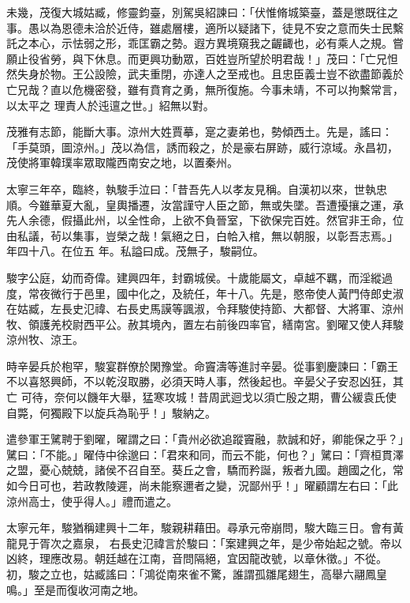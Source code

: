 \begin{pinyinscope}
 未幾，茂復大城姑臧，修靈鈞臺，別駕吳紹諫曰：「伏惟脩城築臺，蓋是懲既往之事。愚以為恩德未洽於近侍，雖處層樓，適所以疑諸下，徒見不安之意而失士民繫託之本心，示怯弱之形，乖匡霸之勢。遐方異境窺我之齷齱也，必有乘人之規。嘗願止役省勞，與下休息。而更興功動眾，百姓豈所望於明君哉！」茂曰：「亡兄怛然失身於物。王公設險，武夫重閉，亦達人之至戒也。且忠臣義士豈不欲盡節義於亡兄哉？直以危機密發，雖有賁育之勇，無所復施。今事未靖，不可以拘繫常言，以太平之
 理責人於迍邅之世。」紹無以對。



 茂雅有志節，能斷大事。涼州大姓賈摹，寔之妻弟也，勢傾西土。先是，謠曰：「手莫頭，圖涼州。」茂以為信，誘而殺之，於是豪右屏跡，威行涼域。永昌初，茂使將軍韓璞率眾取隴西南安之地，以置秦州。



 太寧三年卒，臨終，執駿手泣曰：「昔吾先人以孝友見稱。自漢初以來，世執忠順。今雖華夏大亂，皇輿播遷，汝當謹守人臣之節，無或失墜。吾遭擾攘之運，承先人余德，假攝此州，以全性命，上欲不負晉室，下欲保完百姓。然官非王命，位由私議，茍以集事，豈榮之哉！氣絕之日，白帢入棺，無以朝服，以彰吾志焉。」年四十八。在位五
 年。私謚曰成。茂無子，駿嗣位。



 駿字公庭，幼而奇偉。建興四年，封霸城侯。十歲能屬文，卓越不羈，而淫縱過度，常夜微行于邑里，國中化之，及統任，年十八。先是，愍帝使人黃門侍郎史淑在姑臧，左長史氾禕、右長史馬謨等諷淑，令拜駿使持節、大都督、大將軍、涼州牧、領護羌校尉西平公。赦其境內，置左右前後四率官，繕南宮。劉曜又使人拜駿涼州牧、涼王。



 時辛晏兵於枹罕，駿宴群僚於閑豫堂。命竇濤等進討辛晏。從事劉慶諫曰：「霸王不以喜怒興師，不以乾沒取勝，必須天時人事，然後起也。辛晏父子安忍凶狂，其亡
 可待，奈何以饑年大舉，猛寒攻城！昔周武迴戈以須亡殷之期，曹公緩袁氏使自斃，何獨殿下以旋兵為恥乎！」駿納之。



 遣參軍王騭聘于劉曜，曜謂之曰：「貴州必欲追蹤竇融，款誠和好，卿能保之乎？」騭曰：「不能。」曜侍中徐邈曰：「君來和同，而云不能，何也？」騭曰：「齊桓貫澤之盟，憂心兢兢，諸侯不召自至。葵丘之會，驕而矜誕，叛者九國。趙國之化，常如今日可也，若政教陵遲，尚未能察邇者之變，況鄙州乎！」曜顧謂左右曰：「此涼州高士，使乎得人。」禮而遣之。



 太寧元年，駿猶稱建興十二年，駿親耕藉田。尋承元帝崩問，駿大臨三日。會有黃龍見于胥次之嘉泉，
 右長史氾禕言於駿曰：「案建興之年，是少帝始起之號。帝以凶終，理應改易。朝廷越在江南，音問隔絕，宜因龍改號，以章休徵。」不從。初，駿之立也，姑臧謠曰：「鴻從南來雀不驚，誰謂孤雛尾翅生，高舉六翮鳳皇鳴。」至是而復收河南之地。




\end{pinyinscope}
